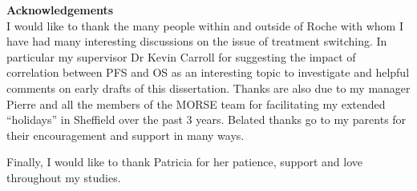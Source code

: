 
\mbox{}\newline\vspace{10mm} \mbox{}\LARGE
%
{\bf Acknowledgements} \normalsize \vspace{5mm}\\
I would like to thank the many people within and outside of Roche with whom I have had many interesting discussions on the issue of treatment switching. In particular my supervisor Dr Kevin Carroll for suggesting the impact of correlation between PFS and OS as an interesting topic to investigate and helpful comments on early drafts of this dissertation. Thanks are also due to my manager Pierre and all the members of the MORSE team for facilitating my extended ``holidays'' in Sheffield over the past 3 years. Belated thanks go to my parents for their encouragement and support in many ways.

Finally, I would like to thank Patricia for her patience, support and love throughout my studies.
